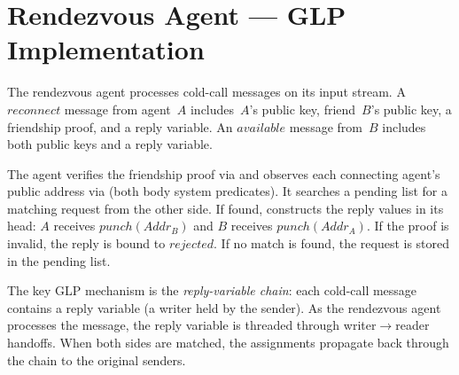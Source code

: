 \appendix
\section{Rendezvous Agent --- GLP Implementation}
\label{appendix:rv-agent}
The rendezvous agent processes cold-call messages on its input stream.  A $\mathit{reconnect}$ message from agent~$A$ includes~$A$'s public key, friend~$B$'s public key, a friendship proof, and a reply variable.  An $\mathit{available}$ message from~$B$ includes both public keys and a reply variable.

The agent verifies the friendship proof via  and observes each connecting agent's public address via  (both body system predicates).  It searches a pending list for a matching request from the other side.  If found,  constructs the reply values in its head: $A$ receives $\mathit{punch}(\mathit{Addr}_B)$ and $B$ receives $\mathit{punch}(\mathit{Addr}_A)$.  If the proof is invalid, the reply is bound to $\mathit{rejected}$.  If no match is found, the request is stored in the pending list.

The key GLP mechanism is the \emph{reply-variable chain}: each cold-call message contains a reply variable (a writer held by the sender).  As the rendezvous agent processes the message, the reply variable is threaded through writer$\to$reader handoffs.  When both sides are matched, the assignments propagate back through the chain to the original senders.

